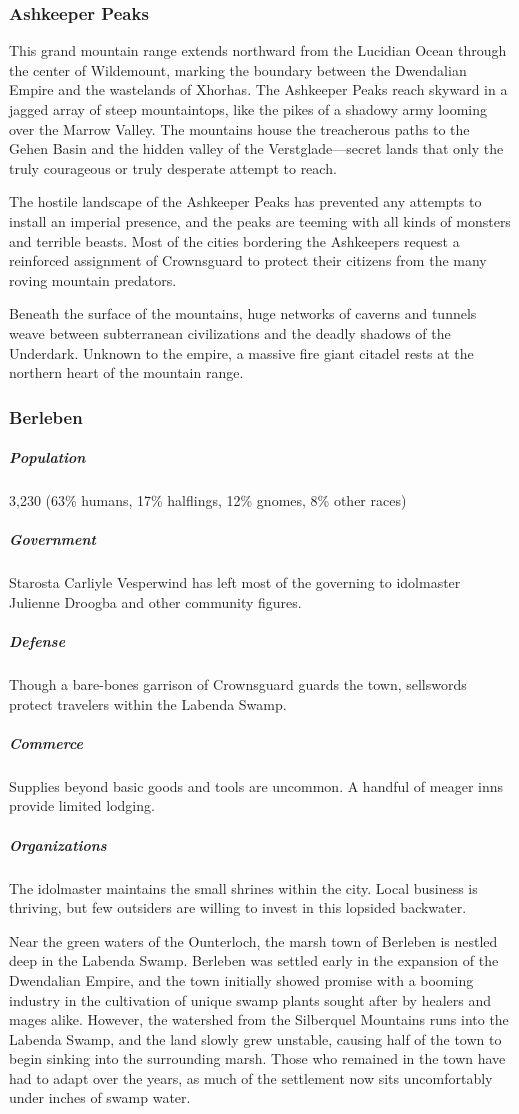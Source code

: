 \documentclass[10pt,a4paper,twoside,bg=print,twocolumn,openany,nodeprecatedcode]{dndbook}
\begin{document}
\subsubsection{Ashkeeper Peaks}
This grand mountain range extends northward from the Lucidian Ocean through the center of Wildemount, marking the boundary between the Dwendalian Empire and the wastelands of Xhorhas. The Ashkeeper Peaks reach skyward in a jagged array of steep mountaintops, like the pikes of a shadowy army looming over the Marrow Valley. The mountains house the treacherous paths to the Gehen Basin and the hidden valley of the Verstglade—secret lands that only the truly courageous or truly desperate attempt to reach.

The hostile landscape of the Ashkeeper Peaks has prevented any attempts to install an imperial presence, and the peaks are teeming with all kinds of monsters and terrible beasts. Most of the cities bordering the Ashkeepers request a reinforced assignment of Crownsguard to protect their citizens from the many roving mountain predators.

Beneath the surface of the mountains, huge networks of caverns and tunnels weave between subterranean civilizations and the deadly shadows of the Underdark. Unknown to the empire, a massive fire giant citadel rests at the northern heart of the mountain range.

\subsubsection{Berleben}
\subparagraph{Population}
3,230 (63\% humans, 17\% halflings, 12\% gnomes, 8\% other races)

\subparagraph{Government}
Starosta Carliyle Vesperwind has left most of the governing to idolmaster Julienne Droogba and other community figures.

\subparagraph{Defense}
Though a bare-bones garrison of Crownsguard guards the town, sellswords protect travelers within the Labenda Swamp.

\subparagraph{Commerce}
Supplies beyond basic goods and tools are uncommon. A handful of meager inns provide limited lodging.

\subparagraph{Organizations}
The idolmaster maintains the small shrines within the city. Local business is thriving, but few outsiders are willing to invest in this lopsided backwater.

Near the green waters of the Ounterloch, the marsh town of Berleben is nestled deep in the Labenda Swamp. Berleben was settled early in the expansion of the Dwendalian Empire, and the town initially showed promise with a booming industry in the cultivation of unique swamp plants sought after by healers and mages alike. However, the watershed from the Silberquel Mountains runs into the Labenda Swamp, and the land slowly grew unstable, causing half of the town to begin sinking into the surrounding marsh. Those who remained in the town have had to adapt over the years, as much of the settlement now sits uncomfortably under inches of swamp water.
\end{document}
